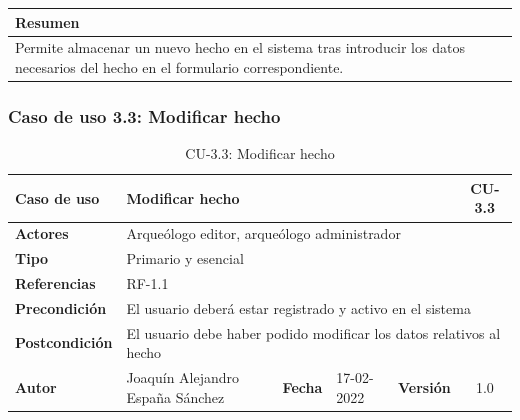     \begin{table}[H]
        \centering
        \begin{tabularx}{\textwidth}{@{} |L |@{}} \hline
            \textbf{Resumen} \\
            \hline
            Permite almacenar un nuevo hecho en el sistema tras introducir los datos
            necesarios del hecho en el formulario correspondiente.\\
            \hline
        \end{tabularx}
    \end{table}

\subsubsection{Caso de uso 3.3: Modificar hecho}

    \begin{table}[H]
    \begin{center}
        \begin{adjustbox}{width=\textwidth}
        \begin{tabular}{ | l | l | l | l | c | c | } 
            \hline
            \textbf{Caso de uso} & \multicolumn{4}{l|}{Modificar hecho} & \cellcolor{gray!50} \textbf{CU-3.3}\\
            \hline
            \textbf{Actores} & \multicolumn{5}{p{0.9\linewidth}|}{Arqueólogo editor, arqueólogo administrador} \\
            \hline
            \textbf{Tipo} & \multicolumn{5}{l|}{Primario y esencial} \\
            \hline
            \textbf{Referencias} & \multicolumn{3}{l|}{RF-1.1} & \multicolumn{2}{l|}{ }\\
            \hline
            \textbf{Precondición} & \multicolumn{5}{l|}{El usuario deberá estar registrado y activo en el sistema} \\
            \hline
            \textbf{Postcondición} & \multicolumn{5}{l|}{El usuario debe haber podido modificar los datos relativos al hecho} \\
            \hline
            \textbf{Autor} & \multicolumn{1}{p{0.25\linewidth}|}{Joaquín Alejandro España Sánchez} & \textbf{Fecha} & 
            17-02-2022     & \textbf{Versión}                                                      & 1.0\\
            \hline
        \end{tabular}
        \end{adjustbox}
        \caption{CU-3.3: Modificar hecho}
        \label{tab:modify-fact}
    \end{center}
    \end{table}

